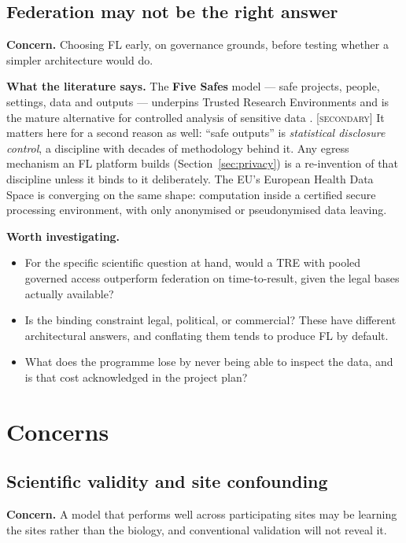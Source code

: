 \documentclass[11pt,a4paper]{article}
\newcommand{\secondary}{\textsc{[secondary]}}
\newcommand{\concern}[1]{\par\medskip\noindent\textbf{Concern.} #1}
\newcommand{\evidence}[1]{\par\smallskip\noindent\textbf{What the literature says.} #1}
\newcommand{\investigate}{\par\smallskip\noindent\textbf{Worth investigating.}}
\begin{document}
\subsection{Federation may not be the right answer}
\label{sec:alternatives}

\concern{Choosing FL early, on governance grounds, before testing whether a
simpler architecture would do.}

\evidence{The \textbf{Five Safes} model --- safe projects, people, settings,
data and outputs --- underpins Trusted Research Environments and is the
mature alternative for controlled analysis of sensitive data
\citep{ritchie_fivesafes}. \secondary{} It matters here for a second reason
as well: ``safe outputs'' is \emph{statistical disclosure control}, a
discipline with decades of methodology behind it. Any egress mechanism an FL
platform builds (Section~\ref{sec:privacy}) is a re-invention of that
discipline unless it binds to it deliberately. The EU's European Health Data
Space \citep{ehds2025} is converging on the same shape: computation inside a
certified secure processing environment, with only anonymised or
pseudonymised data leaving.}

\investigate
\begin{itemize}
  \item For the specific scientific question at hand, would a TRE with
  pooled governed access outperform federation on time-to-result, given the
  legal bases actually available?
  \item Is the binding constraint legal, political, or commercial? These
  have different architectural answers, and conflating them tends to
  produce FL by default.
  \item What does the programme lose by never being able to inspect the
  data, and is that cost acknowledged in the project plan?
\end{itemize}

\section{Concerns}

\subsection{Scientific validity and site confounding}
\label{sec:validity}

\concern{A model that performs well across participating sites may be
learning the sites rather than the biology, and conventional validation will
not reveal it.}
\end{document}
